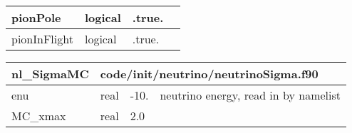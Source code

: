 \documentclass{article}
\begin{document}
\begin{longtable}{llll}
\midrule
pionPole & \begin{minipage}[t]{2cm}logical\end{minipage} & \begin{minipage}[t]{2cm}.true.\end{minipage} & \begin{minipage}[t]{12cm}\end{minipage}\\*
\midrule
pionInFlight & \begin{minipage}[t]{2cm}logical\end{minipage} & \begin{minipage}[t]{2cm}.true.\end{minipage} & \begin{minipage}[t]{12cm}\end{minipage}\\*
\bottomrule
\end{longtable}
{ }




\begin{longtable}{llll}
\toprule
\textbf{\large{nl\_SigmaMC}} & \multicolumn{3}{l}{\footnotesize{code/init/neutrino/neutrinoSigma.f90}}\\*
\midrule
\endfirsthead
\midrule
\endhead
enu & \begin{minipage}[t]{2cm}real\end{minipage} & \begin{minipage}[t]{2cm}-10.\end{minipage} & \begin{minipage}[t]{12cm}neutrino energy, read in by namelist\end{minipage}\\*
\midrule
MC\_xmax & \begin{minipage}[t]{2cm}real\end{minipage} & \begin{minipage}[t]{2cm}2.0\end{minipage} & \begin{minipage}[t]{12cm}\end{minipage}\\*
\bottomrule
\end{longtable}
{ }



\end{document}

